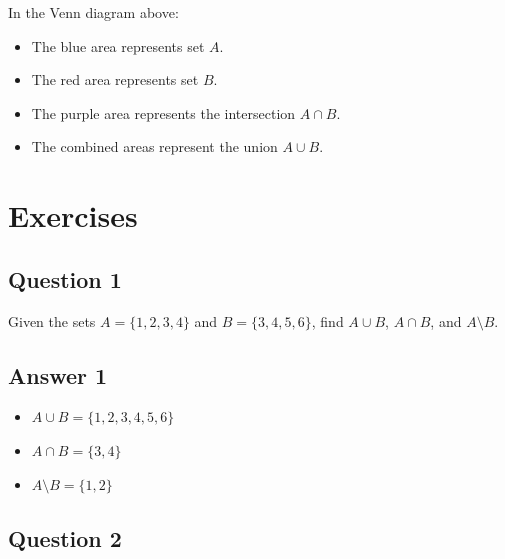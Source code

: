 \documentclass[12pt]{article}
\begin{document}
\begin{center}
\end{center}

In the Venn diagram above:
\begin{itemize}
    \item The blue area represents set \(A\).
    \item The red area represents set \(B\).
    \item The purple area represents the intersection \(A \cap B\).
    \item The combined areas represent the union \(A \cup B\).
\end{itemize}

\newpage

\section{Exercises}

\subsection*{Question 1}

Given the sets \(A = \{1, 2, 3, 4\}\) and \(B = \{3, 4, 5, 6\}\), find \(A \cup B\), \(A \cap B\), and \(A \setminus B\).

\subsection*{Answer 1}

\begin{itemize}
    \item \(A \cup B = \{1, 2, 3, 4, 5, 6\}\)
    \item \(A \cap B = \{3, 4\}\)
    \item \(A \setminus B = \{1, 2\}\)
\end{itemize}

\subsection*{Question 2}
\end{document}
